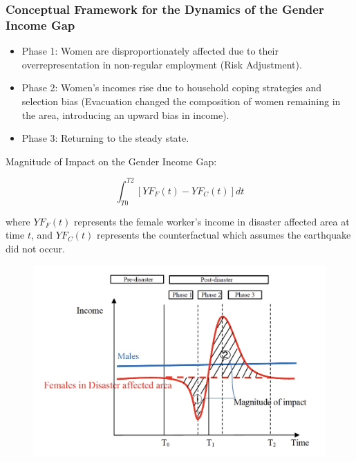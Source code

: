 \documentclass[serif, aspectratio=169]{beamer}
\begin{document}
\begin{frame}[label=conclusion]

\frametitle{Conceptual Framework for the Dynamics of the Gender Income Gap}

    \begin{minipage}[c]{0.4\linewidth}
        \small

        \vspace{-1.4cm}
        

{\footnotesize


\begin{itemize} 

\item Phase 1: Women are disproportionately affected due to their overrepresentation in non-regular employment (Risk Adjustment). 
\item Phase 2: Women's incomes rise due to household coping strategies and selection bias (Evacuation changed the composition of women remaining in the area, introducing an upward bias in income). 
\item Phase 3: Returning to the steady state. 
\end{itemize}


}

{\tiny
Magnitude of Impact on the Gender Income Gap:
}


{\tiny
\begin{equation}
\int_{T0}^{T2} [YF_F(t) - YF_C(t)] dt
\end{equation}
}

{\tiny
where $YF_F(t)$ represents the female worker's income in disaster affected area at time $t$, and $YF_C(t)$ represents the counterfactual which assumes the earthquake did not occur.
}

        
        \vspace{-2.1cm}
        

    \end{minipage}\hspace{0.5cm}
    \begin{minipage}{0.2\linewidth}
        \medskip
        \begin{figure}[h]
            \centering
            \includegraphics[height=.7\textheight]{Final_conceptual_model.jpeg}
        \end{figure}
    \end{minipage}


\end{frame}
\end{document}
